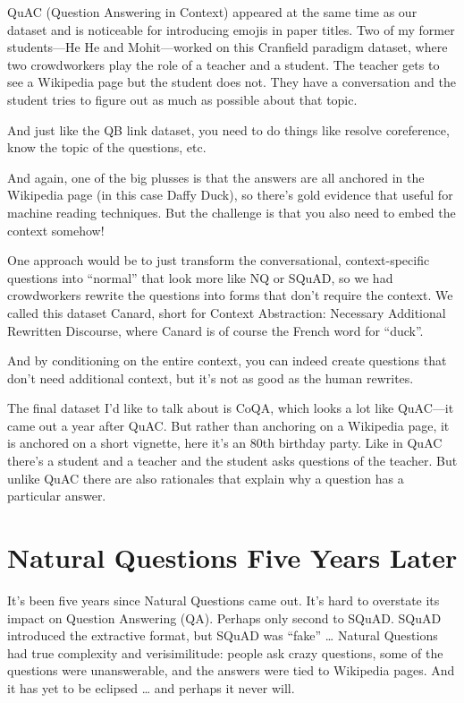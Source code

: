 QuAC (Question Answering in Context) appeared at the same time as our dataset and is noticeable for introducing emojis in paper titles.  Two of my former students—He He and Mohit—worked on this Cranfield paradigm dataset, where two crowdworkers play the role of a teacher and a student.  The teacher gets to see a Wikipedia page but the student does not.  They have a conversation and the student tries to figure out as much as possible about that topic.  

And just like the QB link dataset, you need to do things like resolve coreference, know the topic of the questions, etc.

And again, one of the big plusses is that the answers are all anchored in the Wikipedia page (in this case Daffy Duck), so there’s gold evidence that useful for machine reading techniques.  But the challenge is that you also need to embed the context somehow!

One approach would be to just transform the conversational, context-specific questions into “normal” that look more like NQ or SQuAD, so we had crowdworkers rewrite the questions into forms that don’t require the context.  We called this dataset Canard, short for Context Abstraction: Necessary Additional Rewritten Discourse, where Canard is of course the French word for “duck”.

And by conditioning on the entire context, you can indeed create questions that don’t need additional context, but it’s not as good as the human rewrites.

The final dataset I’d like to talk about is CoQA, which looks a lot like QuAC—it came out a year after QuAC.  But rather than anchoring on a Wikipedia page, it is anchored on a short vignette, here it’s an 80th birthday party.  Like in QuAC there’s a student and a teacher and the student asks questions of the teacher.  But unlike QuAC there are also rationales that explain why a question has a particular answer.

\section{Natural Questions Five Years Later}
\label{sec:nq:problems}

It’s been five years since Natural Questions came out.  It’s hard to overstate its impact on Question Answering (QA).  Perhaps only second to SQuAD.  SQuAD introduced the extractive format, but SQuAD was “fake” … Natural Questions had true complexity and verisimilitude: people ask crazy questions, some of the questions were unanswerable, and the answers were tied to Wikipedia pages.  And it has yet to be eclipsed … and perhaps it never will.  

